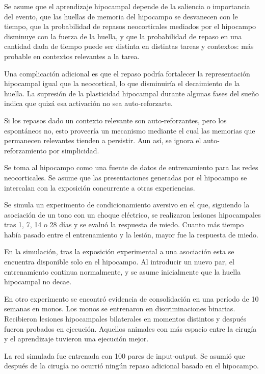 \documentclass[a4paper,12pt]{article}
\begin{document}
Se asume que el aprendizaje hipocampal depende de la saliencia o importancia del evento, que las huellas de memoria del hipocampo se desvanecen con le tiempo, que la probabilidad de repasos neocorticales mediados por el hipocampo disminuye con la fuerza de la huella, y que la probabilidad de repaso en una cantidad dada de tiempo puede ser distinta en distintas tareas y contextos: más probable en contextos relevantes a la tarea.

Una complicación adicional es que el repaso podría fortalecer la representación hipocampal igual que la neocortical, lo que disminuiría el decaimiento de la huella. La supresión de la plasticidad hipocampal durante algunas fases del sueño indica que quizá esa activación no sea auto-reforzarte. 

Si los repasos dado un contexto relevante son auto-reforzantes, pero los espontáneos no, esto proveería un mecanismo mediante el cual las memorias que permanecen relevantes tienden a persistir. Aun así, se ignora el auto-reforzamiento por simplicidad.

Se toma al hipocampo como una fuente de datos de entrenamiento para las redes neocorticales. Se asume que las presentaciones generadas por el hipocampo se intercalan con la exposición concurrente a otras experiencias. 

Se simula un experimento de condicionamiento aversivo en el que, siguiendo  la asociación de un tono con un choque eléctrico, se realizaron lesiones hipocampales tras 1, 7, 14 o 28 días y se evaluó la respuesta de miedo. Cuanto más tiempo había pasado entre el entrenamiento y la lesión, mayor fue la respuesta de miedo.

En la simulación, tras la exposición experimental a una asociación esta se encuentra disponible solo en el hipocampo. Al introducir un nuevo par, el entrenamiento continua normalmente, y se asume inicialmente que la huella hipocampal no decae. 

En otro experimento se encontró evidencia de consolidación en una período de 10 semanas en monos. Los monos se entrenaron en discriminaciones binarias. Recibieron lesiones hipocampales bilaterales en momentos distintos y después fueron probados en ejecución. Aquellos animales con más espacio entre la cirugía y el aprendizaje tuvieron una ejecución mejor.

La red simulada fue entrenada con 100 pares de input-output. Se asumió que después de la cirugía no ocurrió ningún repaso adicional basado en el hipocampo. 
\end{document}
